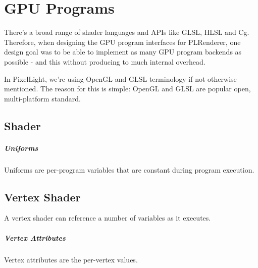 \chapter{GPU Programs}
There's a broad range of shader languages and APIs like GLSL, HLSL and Cg. Therefore, when designing the GPU program interfaces for PLRenderer, one design goal was to be able to implement as many GPU program backends as possible - and this without producing to much internal overhead.

In PixelLight, we're using OpenGL and GLSL terminology if not otherwise mentioned. The reason for this is simple: OpenGL and GLSL are popular open, multi-platform standard.




\section{Shader}


\paragraph{Uniforms}
Uniforms are per-program variables that are constant during program execution.




\section{Vertex Shader}
A vertex shader can reference a number of variables as it executes.


\paragraph{Vertex Attributes}
Vertex attributes are the per-vertex values.


